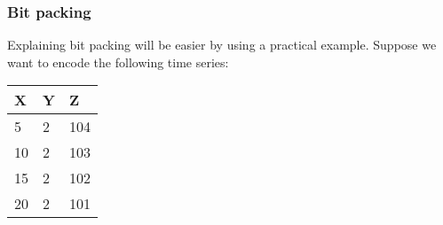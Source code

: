 \subsubsection{Bit packing}
Explaining bit packing will be easier by using a practical example. Suppose we want to encode
the following time series:
\begin{table}[!htbp]
\centering
\begin{tabular}{l|l|l}
\textbf{X} & \textbf{Y} & \textbf{Z} \\ 
\hline
5  & 2 & 104 \\
10 & 2 & 103 \\
15 & 2 & 102 \\
20 & 2 & 101 \\
\end{tabular}
\end{table}

